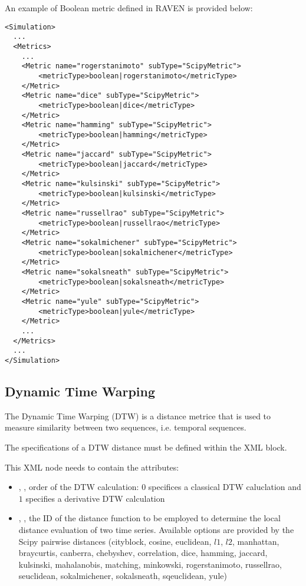 An example of Boolean metric defined in RAVEN is provided below:
\begin{lstlisting}[style=XML]
<Simulation>
  ...
  <Metrics>
    ...
    <Metric name="rogerstanimoto" subType="ScipyMetric">
        <metricType>boolean|rogerstanimoto</metricType>
    </Metric>
    <Metric name="dice" subType="ScipyMetric">
        <metricType>boolean|dice</metricType>
    </Metric>
    <Metric name="hamming" subType="ScipyMetric">
        <metricType>boolean|hamming</metricType>
    </Metric>
    <Metric name="jaccard" subType="ScipyMetric">
        <metricType>boolean|jaccard</metricType>
    </Metric>
    <Metric name="kulsinski" subType="ScipyMetric">
        <metricType>boolean|kulsinski</metricType>
    </Metric>
    <Metric name="russellrao" subType="ScipyMetric">
        <metricType>boolean|russellrao</metricType>
    </Metric>
    <Metric name="sokalmichener" subType="ScipyMetric">
        <metricType>boolean|sokalmichener</metricType>
    </Metric>
    <Metric name="sokalsneath" subType="ScipyMetric">
        <metricType>boolean|sokalsneath</metricType>
    </Metric>
    <Metric name="yule" subType="ScipyMetric">
        <metricType>boolean|yule</metricType>
    </Metric>
    ...
  </Metrics>
  ...
</Simulation>
\end{lstlisting}

\subsection{Dynamic Time Warping}
\label{subsection:DTW}
The Dynamic Time Warping (DTW) is a distance metrice that is used to measure similarity
between two sequences, i.e. temporal sequences.

The specifications of a DTW distance must be defined within the  XML block.

This XML node needs to contain the attributes:


\begin{itemize}
  \item {},          ,    order of the DTW calculation: $0$ specifices a classical DTW caluclation and $1$ specifies
                                                                    a derivative DTW calculation
  \item {},  , the ID of the distance function to be employed to determine the local distance
                                                                    evaluation of two time series. Available options are provided by the Scipy
                                                                    pairwise distances (cityblock, cosine, euclidean, $l1$, $l2$, manhattan,
                                                                    braycurtis, canberra, chebyshev, correlation, dice, hamming, jaccard,
                                                                    kulsinski, mahalanobis, matching, minkowski, rogerstanimoto, russellrao,
                                                                    seuclidean, sokalmichener, sokalsneath, sqeuclidean, yule)
\end{itemize}

